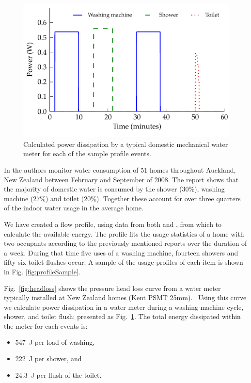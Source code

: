 \documentclass[10pt,final,journal]{IEEEtran}
\begin{document}
    \begin{figure}
        \begin{center}
        \includegraphics[width=\linewidth]{graph_harvest}
        \end{center}
        \caption{Calculated power dissipation by a typical domestic mechanical water meter for each of the sample profile events.}
        \label{fig:powerDissipated_meter}
    \end{figure}


    In \cite{Heinrich2008} the authors monitor water consumption of 51 homes throughout Auckland, New Zealand between February and September of 2008.
    The report shows that the majority of domestic water is consumed by the shower (30\%), washing machine (27\%) and toilet (20\%).
    Together these account for over three quarters of the indoor water usage in the average home.

    We have created a flow profile, using data from both \cite{Heinrich2008} and \cite{Heinrich2007}, from which to calculate the available energy.
    The profile fits the usage statistics of a home with two occupants according to the previously mentioned reports over the duration of a week.
    During that time five uses of a washing machine, fourteen showers and fifty six toilet flushes occur.
    A sample of the usage profiles of each item is shown in Fig. \ref{fig:profileSample}.

    Fig.~\ref{fig:headloss} shows the pressure head loss curve from a water meter typically installed at New Zealand homes (Kent PSMT 25mm).~\cite{WatercareNewZealand2014}
    Using this curve we calculate power dissipation in a water meter during a washing machine cycle, shower, and toilet flush; presented as Fig.~\ref{fig:powerDissipated_meter}.
    The total energy dissipated within the meter for each events is:
    \begin{itemize}
    \item \SI{547}{\joule} per load of washing,
    \item \SI{222}{\joule} per shower, and
    \item \SI{24.3}{\joule} per flush of the toilet.
    \end{itemize}
\end{document}
